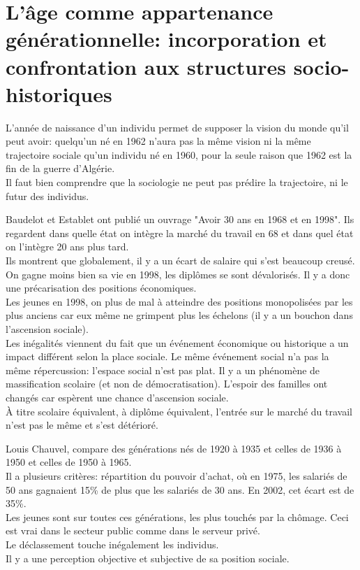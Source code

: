 \documentclass[12pt, a4paper, openany]{book}
\begin{document}
\section{L'âge comme appartenance générationnelle: incorporation et confrontation aux structures socio-historiques}

L'année de naissance d'un individu permet de supposer la vision du monde qu'il peut avoir: quelqu'un né en 1962 n'aura pas la même vision ni la même trajectoire sociale qu'un individu né en 1960, pour la seule raison que 1962 est la fin de la guerre d'Algérie. \\
Il faut bien comprendre que la sociologie ne peut pas prédire la trajectoire, ni le futur des individus. 


Baudelot et Establet ont publié un ouvrage "Avoir 30 ans en 1968 et en 1998". Ils regardent dans quelle état on intègre la marché du travail en 68 et dans quel état on l'intègre 20 ans plus tard. \\
Ils montrent que globalement, il y a un écart de salaire qui s'est beaucoup creusé. On gagne moins bien sa vie en 1998, les diplômes se sont dévalorisés. Il y a donc une précarisation des positions économiques. \\
Les jeunes en 1998, on plus de mal à atteindre des positions monopolisées par les plus anciens car eux même ne grimpent plus les échelons (il y a un bouchon dans l'ascension sociale). \\
Les inégalités viennent du fait que un événement économique ou historique a un impact différent selon la place sociale. Le même événement social n'a pas la même répercussion: l'espace social n'est pas plat.
Il y a un phénomène de massification scolaire (et non de démocratisation). L'espoir des familles ont changés car espèrent une chance d'ascension sociale. \\
À titre scolaire équivalent, à diplôme équivalent, l'entrée sur le marché du travail n'est pas le même et s'est détérioré. 


Louis Chauvel, compare des générations nés de 1920 à 1935 et celles de 1936 à 1950 et celles de 1950 à 1965. \\
Il a plusieurs critères: répartition du pouvoir d'achat, où en 1975, les salariés de 50 ans gagnaient 15\% de plus que les salariés de 30 ans. En 2002, cet écart est de 35\%. \\
Les jeunes sont sur toutes ces générations, les plus touchés par la chômage. Ceci est vrai dans le secteur public comme dans le serveur privé. \\
Le déclassement touche inégalement les individus. \\
Il y a une perception objective et subjective de sa position sociale. 
\end{document}
